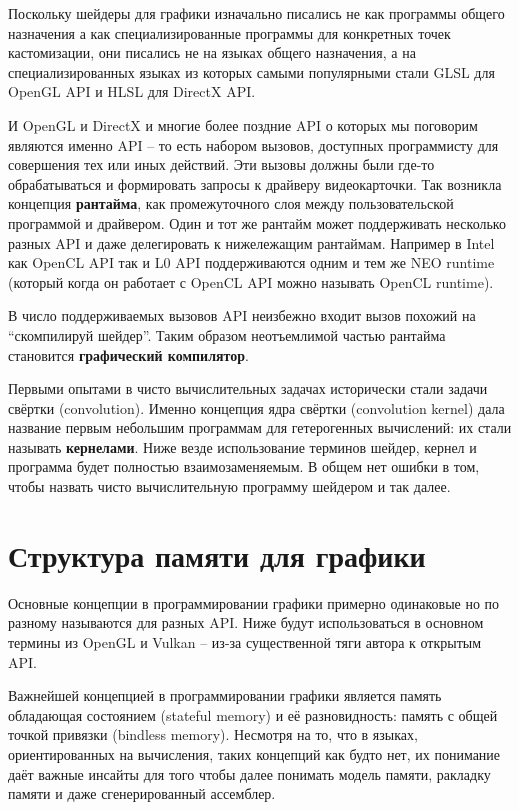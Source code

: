 \documentclass[a4paper,12pt,oneside]{article}
\begin{document}
Поскольку шейдеры для графики изначально писались не как программы общего назначения а как специализированные программы для конкретных точек кастомизации, они писались не на языках общего назначения, а на специализированных языках из которых самыми популярными стали GLSL для OpenGL API и HLSL для DirectX API.

И OpenGL и DirectX и многие более поздние API о которых мы поговорим являются именно API -- то есть набором вызовов, доступных программисту для совершения тех или иных действий.
Эти вызовы должны были где-то обрабатываться и формировать запросы к драйверу видеокарточки.
Так возникла концепция \textbf{рантайма}, как промежуточного слоя между пользовательской программой и драйвером.
Один и тот же рантайм может поддерживать несколько разных API и даже делегировать к нижележащим рантаймам.
Например в Intel как OpenCL API так и L0 API поддерживаются одним и тем же NEO runtime (который когда он работает с OpenCL API можно называть OpenCL runtime).

В число поддерживаемых вызовов API неизбежно входит вызов похожий на ``скомпилируй шейдер''. Таким образом неотъемлимой частью рантайма становится \textbf{графический компилятор}.

Первыми опытами в чисто вычислительных задачах исторически стали задачи свёртки (convolution). 
Именно концепция ядра свёртки (convolution kernel) дала название первым небольшим программам для гетерогенных вычислений: их стали называть \textbf{кернелами}.
Ниже везде использование терминов шейдер, кернел и программа будет полностью взаимозаменяемым.
В общем нет ошибки в том, чтобы назвать чисто вычислительную программу шейдером и так далее.

\pagebreak
\section{Структура памяти для графики}\label{sec:GPUMEM}

Основные концепции в программировании графики примерно одинаковые но по разному называются для разных API. Ниже будут использоваться в основном термины из OpenGL и Vulkan -- из-за существенной тяги автора к открытым API. 

Важнейшей концепцией в программировании графики является память обладающая состоянием (stateful memory) и её разновидность: память с общей точкой привязки (bindless memory). 
Несмотря на то, что в языках, ориентированных на вычисления, таких концепций как будто нет, их понимание даёт важные инсайты для того чтобы далее понимать модель памяти, ракладку памяти и даже сгенерированный ассемблер.
\end{document}
